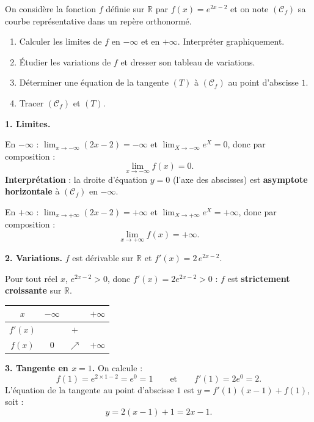\documentclass[11pt]{article}
\begin{document}
\begin{exoresolu}
On considère la fonction $f$ définie sur $\mathbb{R}$ par $f(x) = e^{2x-2}$ et on note $(\mathcal{C}_f)$ sa courbe représentative dans un repère orthonormé.
\begin{enumerate}
\item Calculer les limites de $f$ en $-\infty$ et en $+\infty$. Interpréter graphiquement.
\item Étudier les variations de $f$ et dresser son tableau de variations.
\item Déterminer une équation de la tangente $(T)$ à $(\mathcal{C}_f)$ au point d'abscisse $1$.
\item Tracer $(\mathcal{C}_f)$ et $(T)$.
\end{enumerate}
\tcblower
\textbf{1. Limites.}

En $-\infty$ : $\displaystyle\lim_{x \to -\infty} (2x - 2) = -\infty$ et $\displaystyle\lim_{X \to -\infty} e^X = 0$, donc par composition :
\[ \lim_{x \to -\infty} f(x) = 0. \]
\textbf{Interprétation} : la droite d'équation $y = 0$ (l'axe des abscisses) est \textbf{asymptote horizontale} à $(\mathcal{C}_f)$ en $-\infty$.

En $+\infty$ : $\displaystyle\lim_{x \to +\infty} (2x - 2) = +\infty$ et $\displaystyle\lim_{X \to +\infty} e^X = +\infty$, donc par composition :
\[ \lim_{x \to +\infty} f(x) = +\infty. \]

\textbf{2. Variations.} $f$ est dérivable sur $\mathbb{R}$ et $f'(x) = 2\, e^{2x-2}$.

Pour tout réel $x$, $e^{2x-2} > 0$, donc $f'(x) = 2e^{2x-2} > 0$ : $f$ est \textbf{strictement croissante} sur $\mathbb{R}$.

\begin{center}
\begin{tabular}{|c|ccc|}
\hline
$x$ & $-\infty$ & & $+\infty$ \\
\hline
$f'(x)$ & & $+$ & \\
\hline
$f(x)$ & $0$ & $\nearrow$ & $+\infty$ \\
\hline
\end{tabular}
\end{center}

\textbf{3. Tangente en $x = 1$.} On calcule :
\[ f(1) = e^{2 \times 1 - 2} = e^0 = 1 \qquad \text{et} \qquad f'(1) = 2 e^{0} = 2. \]
L'équation de la tangente au point d'abscisse $1$ est $y = f'(1)(x - 1) + f(1)$, soit :
\[ y = 2(x - 1) + 1 = 2x - 1. \]


\end{exoresolu}
\end{document}
